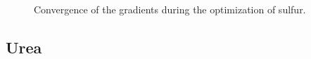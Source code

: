 \twolinestyle{\documentclass[prb,preprint]{revtex4}}
\begin{document}
{\begin{figure}[h]
\caption{Convergence of the gradients during the optimization of sulfur.}
\label{Sulfur-grads}
\end{figure}
}

\subsection{Urea}
\end{document}
